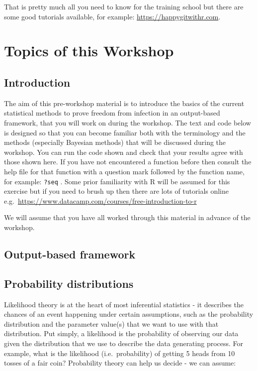 \documentclass[
  12pt,
]{article}
\begin{document}
That is pretty much all you need to know for the training school but
there are some good tutorials available, for example:
\url{https://happygitwithr.com}.

\hypertarget{topics-of-this-workshop}{%
\section{Topics of this Workshop}\label{topics-of-this-workshop}}

\hypertarget{introduction}{%
\subsection{Introduction}\label{introduction}}

The aim of this pre-workshop material is to introduce the basics of the
current statistical methods to prove freedom from infection in an
output-based framework, that you will work on during the workshop. The
text and code below is designed so that you can become familiar both
with the terminology and the methods (especially Bayesian methods) that
will be discussed during the workshop. You can run the code shown and
check that your results agree with those shown here. If you have not
encountered a function before then consult the help file for that
function with a question mark followed by the function name, for
example: \texttt{?seq} . Some prior familiarity with R will be assumed
for this exercise but if you need to brush up then there are lots of
tutorials online
e.g.~\url{https://www.datacamp.com/courses/free-introduction-to-r}

We will assume that you have all worked through this material in advance
of the workshop.

\hypertarget{output-based-framework}{%
\subsection{Output-based framework}\label{output-based-framework}}

\hypertarget{probability-distributions}{%
\subsection{Probability distributions}\label{probability-distributions}}

Likelihood theory is at the heart of most inferential statistics - it
describes the chances of an event happening under certain assumptions,
such as the probability distribution and the parameter value(s) that we
want to use with that distribution. Put simply, a likelihood is the
probability of observing our data given the distribution that we use to
describe the data generating process. For example, what is the
likelihood (i.e.~probability) of getting 5 heads from 10 tosses of a
fair coin? Probability theory can help us decide - we can assume:
\end{document}
